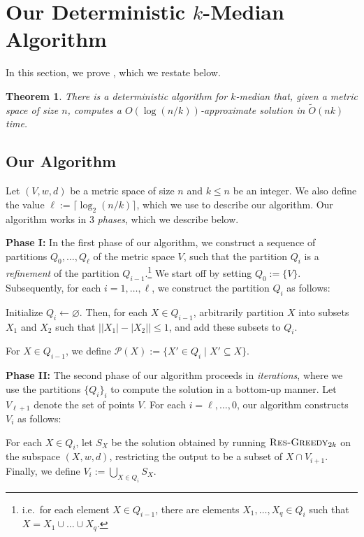 \documentclass[11pt]{article}
\newenvironment{wrapper}[1]
{
\begin{center}
		\begin{minipage}{\linewidth}
			\begin{mdframed}[hidealllines=true, backgroundcolor=gray!20, leftmargin=0cm,innerleftmargin=0.4cm,innerrightmargin=0.4cm,innertopmargin=0.4cm,innerbottommargin=0.4cm,roundcorner=0pt]
				#1}
			{\end{mdframed}
		\end{minipage}
	\end{center}
}
\newcommand{\1}{\mathmybb{1}}
\newtheorem{theorem}{Theorem}[section]
\newcommand{\Restr}{\textnormal{\textsc{Res-Greedy}}}
\begin{document}
\section{Our Deterministic $k$-Median Algorithm}\label{sec:our alg}

In this section, we prove , which we restate below.

\begin{theorem}\label{thm:main:fast:restate}
    There is a deterministic algorithm for $k$-median that, given a metric space of size $n$, computes a $O(\log(n/k))$-approximate solution in $\tilde O(nk)$ time.
\end{theorem}

\subsection{Our Algorithm}

Let $(V, w, d)$ be a metric space of size $n$ and $k \leq n$ be an integer.
We also define the value $\ell := \lceil \log_2(n/k) \rceil$, which we use to describe our algorithm.
Our algorithm works in 3 \emph{phases}, which we describe below.

\medskip
\noindent
\textbf{Phase I:} In the first phase of our algorithm, we construct a sequence of partitions $Q_0,\dots, Q_\ell$ of the metric space $V$, such that the partition $Q_i$ is a \emph{refinement} of the partition $Q_{i-1}$.\footnote{i.e.~for each element $X \in Q_{i-1}$, there are elements $X_1,\dots, X_q \in Q_i$ such that $X=X_1\cup \dots \cup X_q$.} We start off by setting $Q_0 := \{V\}$. Subsequently, for each $i = 1,\dots,\ell$, we construct the partition $Q_i$ as follows:

\begin{wrapper}
    Initialize $Q_i \leftarrow \varnothing$. Then, for each $X \in Q_{i-1}$, arbitrarily partition $X$ into subsets $X_1$ and $X_{2}$ such that $\left||X_1| - |X_2|\right| \leq 1$, and add these subsets to $Q_i$.
\end{wrapper}
For $X \in Q_{i-1}$, we define $\mathcal P(X) := \{X' \in Q_{i} \mid X' \subseteq X\}$.

\medskip
\noindent
\textbf{Phase II:}
The second phase of our algorithm proceeds in \emph{iterations}, where we use the partitions $\{Q_i\}_i$ to compute the solution in a bottom-up manner.
Let $V_{\ell + 1}$ denote the set of points $V$.
For each $i = \ell ,\dots, 0$, our algorithm constructs $V_i$ as follows:

\begin{wrapper}
    For each $X \in Q_i$, let $S_X$ be the solution obtained by running $\Restr_{2k}$ on the subspace $(X,w,d)$, restricting the output to be a subset of $X \cap V_{i+1}$. Finally, we define $V_i := \bigcup_{X \in Q_i} S_X$.
\end{wrapper}
\end{document}
